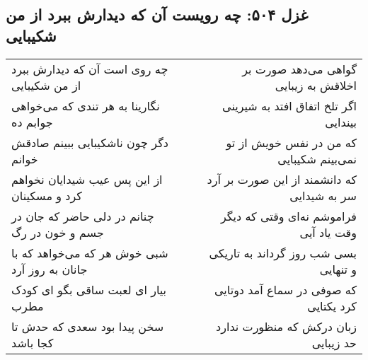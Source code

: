 \begin{center}
\section*{غزل ۵۰۴: چه رویست آن که دیدارش ببرد از من شکیبایی}
\label{sec:504}
\begin{longtable}{l p{0.5cm} r}
چه روی است آن که دیدارش ببرد از من شکیبایی
&&
گواهی می‌دهد صورت بر اخلاقش به زیبایی
\\
نگارینا به هر تندی که می‌خواهی جوابم ده
&&
اگر تلخ اتفاق افتد به شیرینی بیندایی
\\
دگر چون ناشکیبایی ببینم صادقش خوانم
&&
که من در نفس خویش از تو نمی‌بینم شکیبایی
\\
از این پس عیب شیدایان نخواهم کرد و مسکینان
&&
که دانشمند از این صورت بر آرد سر به شیدایی
\\
چنانم در دلی حاضر که جان در جسم و خون در رگ
&&
فراموشم نه‌ای وقتی که دیگر وقت یاد آیی
\\
شبی خوش هر که می‌خواهد که با جانان به روز آرد
&&
بسی شب روز گرداند به تاریکی و تنهایی
\\
بیار ای لعبت ساقی بگو ای کودک مطرب
&&
که صوفی در سماع آمد دوتایی کرد یکتایی
\\
سخن پیدا بود سعدی که حدش تا کجا باشد
&&
زبان درکش که منظورت ندارد حد زیبایی
\\
\end{longtable}
\end{center}
